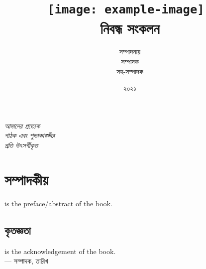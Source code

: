 \title{
\texttt{[image: example-image]}~\\[1cm]
নিবন্ধ সংকলন}
\author{সম্পাদনায় \\ 
সম্পাদক\\ 
সহ-সম্পাদক}

\date{২০২১}

\begin{titlepage}

\thispagestyle{empty}
\predate{\centering}
\maketitle
\end{titlepage}


\pagestyle{empty}
\begin{flushright}
\itshape
আমাদের প্রত্যেক \\ পাঠক এবং শুভাকাঙ্ক্ষীর \\ প্রতি উৎসর্গীকৃত
\end{flushright}

\cleardoublepage

\newpage
\pagestyle{plain}

\chapter{সম্পাদকীয়}
 is the preface/abstract of the book.
\blindtext \\

\section*{কৃতজ্ঞতা}
 is the acknowledgement of the book.
\blindtext \\
\hspace*{\fill} {— সম্পাদক,  তারিখ}

\cleardoublepage

\setcounter{tocdepth}{0}
\tableofcontents

\newpage
\pagestyle{plain}

